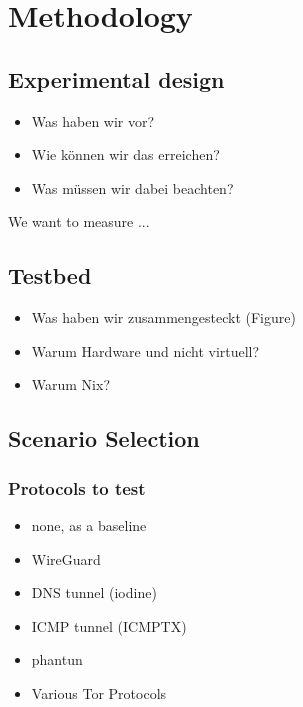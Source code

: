 
\chapter{Methodology}
\label{chap:methodology}

\section{Experimental design}
\begin{itemize}
  \item Was haben wir vor?
  \item Wie können wir das erreichen?
  \item Was müssen wir dabei beachten?
\end{itemize}
We want to measure ...


\section{Testbed}
\begin{itemize}
  \item Was haben wir zusammengesteckt (Figure)
  \item Warum Hardware und nicht virtuell?
  \item Warum Nix?
\end{itemize}

\section{Scenario Selection}
\subsection{Protocols to test}
\begin{itemize}
  \item none, as a baseline
  \item WireGuard
  \item DNS tunnel (iodine)
  \item ICMP tunnel (ICMPTX)
  \item phantun
  \item Various Tor Protocols
\end{itemize}


